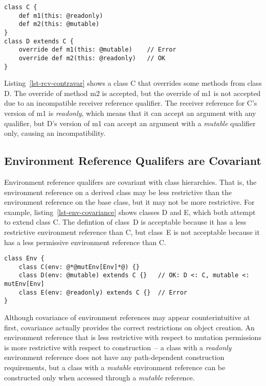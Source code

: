 \begin{lstlisting}[caption={Receiver Reference Contravariance},float={htp},label={lst-rcv-contravar}]
class C {
	def m1(this: @readonly)
	def m2(this: @mutable)
}
class D extends C {
	override def m1(this: @mutable)    // Error
	override def m2(this: @readonly)   // OK
}
\end{lstlisting}

Listing~\ref{lst-rcv-contravar} shows a class {\cd C} that overrides some methods
from class {\cd D}. The override of method {\cd m2} is accepted, but the override
of {\cd m1} is not accepted due to an incompatible receiver reference qualifier.
The receiver reference for {\cd C}'s version of {\cd m1} is {\em readonly}, which means that it
can accept an argument with any qualifier, but {\cd D}'s version of {\cd m1}
can accept an argument with a {\em mutable} qualifier only, causing an incompatibility.

\subsection{Environment Reference Qualifers are Covariant} \label{sec-env-covariance}

Environment reference qualifers are covariant with class hierarchies.
That is, the environment reference on a derived class may be less restrictive than
the environment reference on the base class, but
it may not be more restrictive.
For example, listing~\ref{lst-env-covariance} shows classes {\cd D} and {\cd E},
which both attempt to extend class {\cd C}.
The defintion of class~{\cd D} is acceptable because it has a less restrictive environment reference than {\cd C},
but class~{\cd E} is not acceptable because it has a less permissive environment reference
than {\cd C}.

\begin{lstlisting}[caption={Covariance of Environment References},float={htp},label={lst-env-covariance}]
class Env {
	class C(env: @*@mutEnv[Env]*@) {}
	class D(env: @mutable) extends C {}   // OK: D <: C, mutable <: mutEnv[Env]
	class E(env: @readonly) extends C {}  // Error
}
\end{lstlisting}

Although covariance of environment references may appear counterintuitive at first,
covariance actually provides the correct restrictions on object creation.
An environment reference that is less restrictive with respect to mutation permissions
is more restrictive with respect to construction~-- a class with a {\em readonly}
environment reference does not have any path-dependent construction requirements,
but a class with a {\em mutable} environment reference can be constructed only when
accessed through a {\em mutable} reference.


